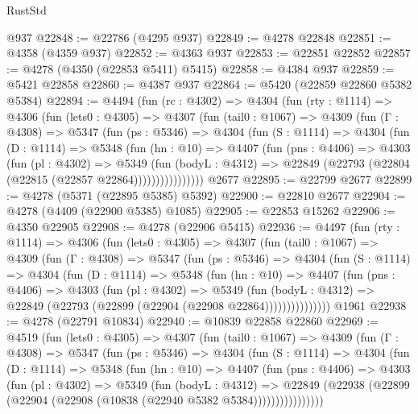\begin{lexlean}{RustStd}
\begin{coremodule}
    @937
@22848 := @22786 (@4295 @937)
@22849 := @4278 @22848
@22851 := @4358 (@4359 @937)
@22852 := @4363 @937
@22853 := @22851 @22852
@22857 := @4278 (@4350 (@22853 @5411) @5415)
@22858 := @4384 @937
@22859 := @5421 @22858
@22860 := @4387 @937
@22864 := @5420 (@22859 @22860 @5382 @5384)
@22894 := @4494
    (fun (rc : @4302) =>
    @4304
      (fun (rty : @1114) =>
      @4306
        (fun (lets0 : @4305) =>
        @4307
          (fun (tail0 : @1067) =>
          @4309
            (fun (Γ : @4308) =>
            @5347
              (fun (ps : @5346) =>
              @4304
                (fun (S : @1114) =>
                @4304
                  (fun (D : @1114) =>
                  @5348
                    (fun (hn : @10) =>
                    @4407
                      (fun (pns : @4406) =>
                      @4303
                        (fun (pl : @4302) =>
                        @5349
                          (fun (bodyL : @4312) =>
                          @22849 (@22793 (@22804 (@22815 (@22857 @22864))))))))))))))))
    @2677
@22895 := @22799 @2677
@22899 := @4278 (@5371 (@22895 @5385) @5392)
@22900 := @22810 @2677
@22904 := @4278 (@4409 (@22900 @5385) @1085)
@22905 := @22853 @15262
@22906 := @4350 @22905
@22908 := @4278 (@22906 @5415)
@22936 := @4497
    (fun (rty : @1114) =>
    @4306
      (fun (lets0 : @4305) =>
      @4307
        (fun (tail0 : @1067) =>
        @4309
          (fun (Γ : @4308) =>
          @5347
            (fun (ps : @5346) =>
            @4304
              (fun (S : @1114) =>
              @4304
                (fun (D : @1114) =>
                @5348
                  (fun (hn : @10) =>
                  @4407
                    (fun (pns : @4406) =>
                    @4303
                      (fun (pl : @4302) =>
                      @5349
                        (fun (bodyL : @4312) =>
                        @22849 (@22793 (@22899 (@22904 (@22908 @22864)))))))))))))))
    @1961
@22938 := @4278 (@22791 @10834)
@22940 := @10839 @22858 @22860
@22969 := @4519
    (fun (lets0 : @4305) =>
    @4307
      (fun (tail0 : @1067) =>
      @4309
        (fun (Γ : @4308) =>
        @5347
          (fun (ps : @5346) =>
          @4304
            (fun (S : @1114) =>
            @4304
              (fun (D : @1114) =>
              @5348
                (fun (hn : @10) =>
                @4407
                  (fun (pns : @4406) =>
                  @4303
                    (fun (pl : @4302) =>
                    @5349
                      (fun (bodyL : @4312) =>
                      @22849
                        (@22938 (@22899 (@22904 (@22908 (@10838 (@22940 @5382 @5384))))))))))))))))

\end{coremodule}
\end{lexlean}
